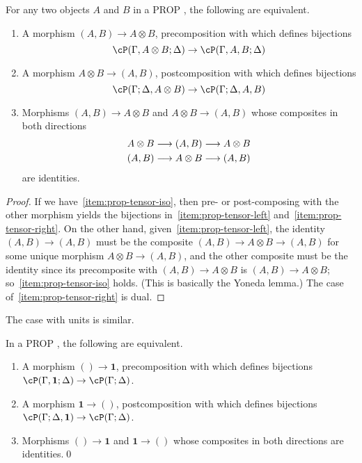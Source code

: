 \documentclass{book}
\def\one{\mathbf{1}}
\let\tensor\otimes
\begin{document}
\begin{thm}\label{thm:prop-tensor}
  For any two objects $A$ and $B$ in a PROP \cP, the following are equivalent.
  \begin{enumerate}
  \item A morphism $(A,B) \to A\tensor B$, precomposition with which defines bijections\label{item:prop-tensor-left}
    \[ \cP(\Gamma,A\tensor B;\Delta) \to \cP(\Gamma,A,B;\Delta) \]
  \item A morphism $A\tensor B \to (A,B)$, postcomposition with which defines bijections\label{item:prop-tensor-right}
    \[ \cP(\Gamma;\Delta,A\tensor B) \to \cP(\Gamma;\Delta,A,B) \]
  \item Morphisms $(A,B) \to A\tensor B$ and $A\tensor B \to (A,B)$ whose composites in both directions
    \begin{gather*}
      A\tensor B \too (A,B)  \too A\tensor B\\
      (A,B)\too A\tensor B \too (A,B)
    \end{gather*}
    are identities.\label{item:prop-tensor-iso}
  \end{enumerate}
\end{thm}
\begin{proof}
  If we have~\ref{item:prop-tensor-iso}, then pre- or post-composing with the other morphism yields the bijections in~\ref{item:prop-tensor-left} and~\ref{item:prop-tensor-right}.
  On the other hand, given~\ref{item:prop-tensor-left}, the identity $(A,B)\to (A,B)$ must be the composite $(A,B)\to A\tensor B \to (A,B)$ for some unique morphism $A\tensor B \to (A,B)$, and the other composite must be the identity since its precomposite with $(A,B)\to A\tensor B$ is $(A,B)\to A\tensor B$; so~\ref{item:prop-tensor-iso} holds.
  (This is basically the Yoneda lemma.)
  The case of~\ref{item:prop-tensor-right} is dual.
\end{proof}

The case with units is similar.

\begin{thm}\label{thm:prop-unit}
  In a PROP \cP, the following are equivalent.
  \begin{enumerate}
  \item A morphism $()\to \one$, precomposition with which defines bijections $\cP(\Gamma,\one;\Delta) \to \cP(\Gamma;\Delta)$.
  \item A morphism $\one\to()$, postcomposition with which defines bijections $\cP(\Gamma;\Delta,\one) \to \cP(\Gamma;\Delta)$.
  \item Morphisms $()\to \one$ and $\one\to()$ whose composites in both directions are identities.\qed
  \end{enumerate}
\end{thm}
\end{document}
